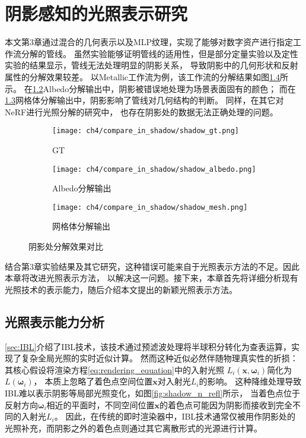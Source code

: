 
\chapter{阴影感知的光照表示研究}

本文第3章通过混合的几何表示以及MLP纹理，实现了能够对数字资产进行指定工作流分解的管线。
虽然实验能够证明管线的适用性，但是部分定量实验以及定性实验的结果显示，管线无法处理明显的阴影关系，
导致阴影中的几何形状和反射属性的分解效果较差。
以Metallic工作流为例，该工作流的分解结果如图\ref{fig:shadow_error}所示。
在\ref{fig:shadow_albedo}Albedo分解输出中，阴影被错误地处理为场景表面固有的颜色；
而在\ref{fig:shadow_mesh}网格体分解输出中，阴影影响了管线对几何结构的判断。
同样，在其它对NeRF进行光照分解的研究中\cite{Zhang_2021, Wu_2023}，
也存在阴影处的数据无法正确处理的问题。

\begin{figure}[H]
  \centering
  \begin{subfigure}[t]{0.3\textwidth}
    \centering
    \texttt{[image: ch4/compare\_in\_shadow/shadow\_gt.png]}
    \caption{GT}
    \label{fig:shadow_gt}
  \end{subfigure}
  \begin{subfigure}[t]{0.3\textwidth}
    \centering
    \texttt{[image: ch4/compare\_in\_shadow/shadow\_albedo.png]}
    \caption{Albedo分解输出}
    \label{fig:shadow_albedo}
  \end{subfigure}
  \begin{subfigure}[t]{0.3\textwidth}
    \centering
    \texttt{[image: ch4/compare\_in\_shadow/shadow\_mesh.png]}
    \caption{网格体分解输出}
    \label{fig:shadow_mesh}
  \end{subfigure}
  \caption{阴影处分解效果对比}
  \label{fig:shadow_error}
\end{figure}

结合第3章实验结果及其它研究，这种错误可能来自于光照表示方法的不足。因此本章将改进光照表示方法，
以解决这一问题。接下来，本章首先将详细分析现有光照技术的表示能力，随后介绍本文提出的新颖光照表示方法。

\section{光照表示能力分析}

\ref{sec:IBL}介绍了IBL技术，该技术通过预滤波处理将半球积分转化为查表运算，实现了复杂全局光照的实时近似计算。
然而这种近似必然伴随物理真实性的折损：
其核心假设将渲染方程\eqref{eq:rendering_equation}中的入射光照
$L_i\left(\boldsymbol{x},{\boldsymbol{\omega}}_i\right)$简化为$L({\boldsymbol{\omega}}_i)$，
本质上忽略了着色点空间位置$\boldsymbol{x}$对入射光$L_i$的影响。
这种降维处理导致IBL难以表示阴影等局部光照变化，如图\ref{fig:shadow_n_refl}所示，
当着色点位于反射方向${\boldsymbol{\omega}}_i$相近的平面时，不同空间位置$\boldsymbol{x}$的着色点可能因为阴影而接收到完全不同的入射光$L_i$。
因此，在传统的即时渲染器中，IBL技术通常仅被用作阴影处的光照补充，而阴影之外的着色点则通过其它离散形式的光源进行计算。

